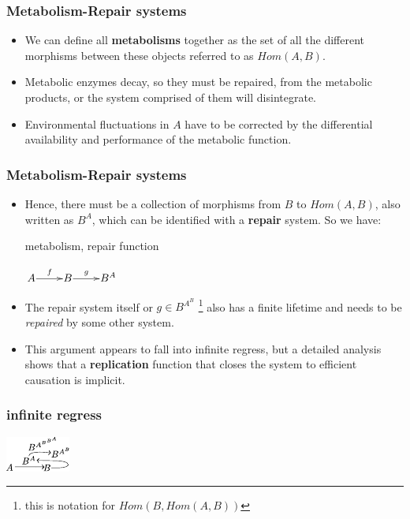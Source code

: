 \begin{frame}
\frametitle{Metabolism-Repair systems}
\begin{itemize}
\item We can define all \textbf{metabolisms} together as the set of all the different morphisms between these objects referred to as $Hom(A,B)$. 
\item Metabolic enzymes decay, so they must be repaired, from the metabolic products, or the system comprised of them will disintegrate. 
\item Environmental fluctuations in $A$ have to be corrected by the differential availability and performance of the metabolic function.
\end{itemize}	
\end{frame}

\begin{frame}

\frametitle{Metabolism-Repair systems}
\begin{itemize}
\item Hence, there must be a collection of morphisms from $B$ to $Hom(A,B)$, also written as $B^A$, which can be identified with a \textbf{repair} system. So we have:

\begin{block}{metabolism, repair function}
\begin{center}
	$
	\xymatrix@1{
	A\ar[r]^f &B\ar[r]^-g & B^A}
	$
\end{center}
\end{block}
\item The repair system itself or $g \in B^{A^B}$ \footnote{this is notation for $Hom(B,Hom(A,B))$} also has a finite lifetime and needs to be {\it repaired} by some other system. 
\item This argument appears to fall into infinite regress, but a detailed analysis shows that a \textbf{replication} function that closes the system to efficient causation is implicit.
\end{itemize}
\end{frame}

\begin{frame}
\frametitle{infinite regress}
	\begin{center}
		\includegraphics[width=0.4\framewidth]{fig/mrcatclose.pdf}
	\end{center}
\end{frame}


